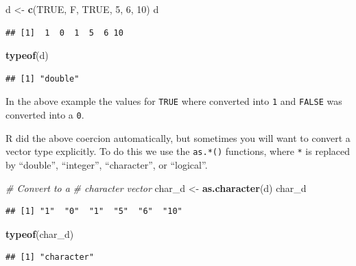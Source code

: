 \documentclass[
]{book}
\newenvironment{Shaded}{\begin{snugshade}}{\end{snugshade}}
\newcommand{\CommentTok}[1]{\textcolor[rgb]{0.56,0.35,0.01}{\textit{#1}}}
\newcommand{\DecValTok}[1]{\textcolor[rgb]{0.00,0.00,0.81}{#1}}
\newcommand{\KeywordTok}[1]{\textcolor[rgb]{0.13,0.29,0.53}{\textbf{#1}}}
\newcommand{\NormalTok}[1]{#1}
\newcommand{\OtherTok}[1]{\textcolor[rgb]{0.56,0.35,0.01}{#1}}
\newcommand{\StringTok}[1]{\textcolor[rgb]{0.31,0.60,0.02}{#1}}
\begin{document}
\begin{Shaded}
\begin{Highlighting}[]
\NormalTok{d <-}\StringTok{ }\KeywordTok{c}\NormalTok{(}\OtherTok{TRUE}\NormalTok{, F, }\OtherTok{TRUE}\NormalTok{,}
    \DecValTok{5}\NormalTok{, }\DecValTok{6}\NormalTok{, }\DecValTok{10}\NormalTok{)}
\NormalTok{d}
\end{Highlighting}
\end{Shaded}

\begin{verbatim}
## [1]  1  0  1  5  6 10
\end{verbatim}

\begin{Shaded}
\begin{Highlighting}[]
\KeywordTok{typeof}\NormalTok{(d)}
\end{Highlighting}
\end{Shaded}

\begin{verbatim}
## [1] "double"
\end{verbatim}

In the above example the values for \texttt{TRUE} where converted into \texttt{1} and \texttt{FALSE} was converted into a \texttt{0}.

R did the above coercion automatically, but sometimes you will want to convert a vector type explicitly. To do this we use the \texttt{as.*()} functions, where \texttt{*} is replaced by ``double'', ``integer'', ``character'', or ``logical''.

\begin{Shaded}
\begin{Highlighting}[]
\CommentTok{# Convert to a}
\CommentTok{# character vector}
\NormalTok{char_d <-}\StringTok{ }\KeywordTok{as.character}\NormalTok{(d)}
\NormalTok{char_d}
\end{Highlighting}
\end{Shaded}

\begin{verbatim}
## [1] "1"  "0"  "1"  "5"  "6"  "10"
\end{verbatim}

\begin{Shaded}
\begin{Highlighting}[]
\KeywordTok{typeof}\NormalTok{(char_d)}
\end{Highlighting}
\end{Shaded}

\begin{verbatim}
## [1] "character"
\end{verbatim}
\end{document}
